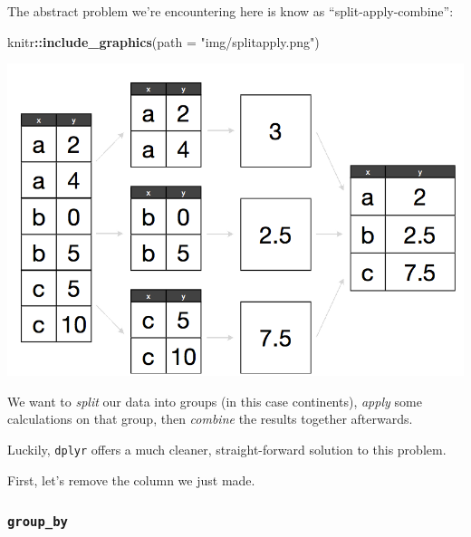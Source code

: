 \documentclass[]{book}
\newenvironment{Shaded}{\begin{snugshade}}{\end{snugshade}}
\newcommand{\KeywordTok}[1]{\textcolor[rgb]{0.13,0.29,0.53}{\textbf{#1}}}
\newcommand{\DataTypeTok}[1]{\textcolor[rgb]{0.13,0.29,0.53}{#1}}
\newcommand{\StringTok}[1]{\textcolor[rgb]{0.31,0.60,0.02}{#1}}
\newcommand{\CommentTok}[1]{\textcolor[rgb]{0.56,0.35,0.01}{\textit{#1}}}
\newcommand{\OtherTok}[1]{\textcolor[rgb]{0.56,0.35,0.01}{#1}}
\newcommand{\OperatorTok}[1]{\textcolor[rgb]{0.81,0.36,0.00}{\textbf{#1}}}
\newcommand{\NormalTok}[1]{#1}
\begin{document}
The abstract problem we're encountering here is know as
``split-apply-combine'':

\begin{Shaded}
\begin{Highlighting}[]
\NormalTok{knitr}\OperatorTok{::}\KeywordTok{include_graphics}\NormalTok{(}\DataTypeTok{path =} \StringTok{"img/splitapply.png"}\NormalTok{)}
\end{Highlighting}
\end{Shaded}

\begin{center}\includegraphics[width=0.7\linewidth]{img/splitapply} \end{center}

We want to \emph{split} our data into groups (in this case continents),
\emph{apply} some calculations on that group, then \emph{combine} the
results together afterwards.

Luckily, \texttt{dplyr} offers a much cleaner, straight-forward solution
to this problem.

First, let's remove the column we just made.

\begin{Shaded}
\end{Shaded}

\subsubsection{\texorpdfstring{\texttt{group\_by}}{group\_by}}\label{group_by}
\end{document}
